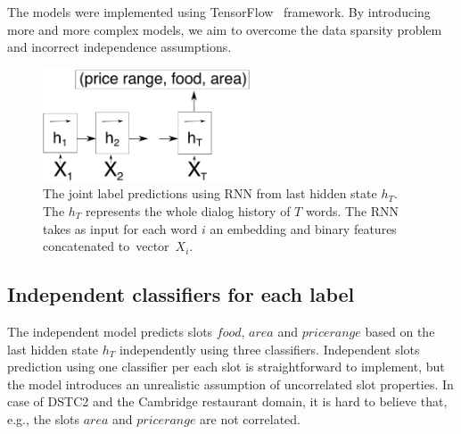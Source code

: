 \documentclass{itatnew}
\def\OD#1{{\color{darkgreen}OD: \it #1}}
\def\ODdel#1{\bgroup\markoverwith{\textcolor{darkgreen}{\rule[0.5ex]{2pt}{1pt}}}\ULon{#1}}
\begin{document}
The models were implemented using TensorFlow~\cite{abaditensorflow} framework. By introducing more and more complex models, we aim to overcome the data sparsity problem and incorrect independence assumptions.

\begin{figure}
\begin{center}
\includegraphics[height=9em]{encoder_joint}
\caption{The joint label predictions using RNN from last hidden state $h_T$. The $h_T$ represents the whole dialog history of $T$ words. The RNN takes as input for each word $i$ an embedding and binary features concatenated to~vector~$X_{i}$.}
\end{center}
\vspace{-0.70em}
\label{fig_encjoint}
\end{figure}

\subsection{Independent classifiers for each label}
\label{sec:indep}
The independent model predicts slots $food$, $area$ and $price range$ based on the last hidden state $h_{T}$ independently using three classifiers.
Independent slots prediction using one classifier per each slot is straightforward to implement, but the model introduces an unrealistic assumption of uncorrelated slot properties.
In case of DSTC2 and the Cambridge restaurant domain, it is hard to believe that, e.g., the slots $area$ and $price range$ are not correlated.
\end{document}
